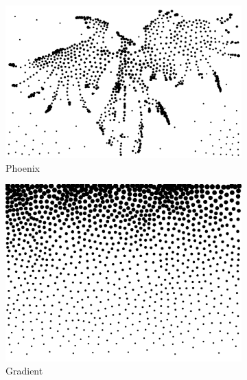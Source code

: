 \documentclass[11pt]{article}
\begin{document}
\begin{enumerate}
\begin{figure}[H]
    \centering
        \begin{subfigure}{0.3\textwidth}
        \centering
        \includegraphics[width=\textwidth]{../results/hedcuter/4-1.pdf}
         \caption{Phoenix}
    \end{subfigure}
    \begin{subfigure}{0.3\textwidth}
        \centering
        \includegraphics[width=\textwidth]{../results/hedcuter/4-2.pdf}
         \caption{Gradient}
    \end{subfigure}
        \begin{subfigure}{0.3\textwidth}
        \centering

\end{subfigure}
\end{figure}
\end{enumerate}
\end{document}
